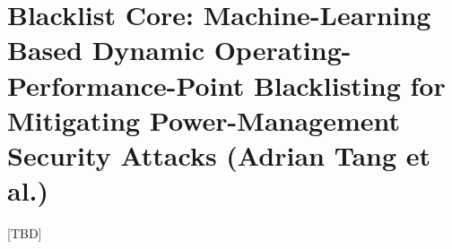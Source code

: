 \section{Blacklist Core: Machine-Learning Based Dynamic
Operating-Performance-Point Blacklisting for Mitigating Power-Management
Security Attacks (Adrian Tang et al.)}

[TBD]
